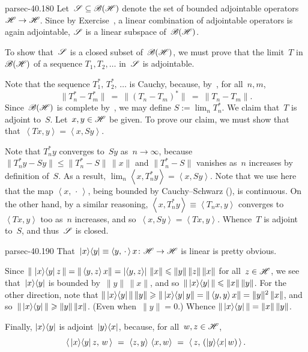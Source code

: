 \documentclass[b5page]{book}
\begin{document}
\begin{solution}{parsec-40.180}%
Let~$\mathscr{S} \subseteq \mathscr{B}(\mathscr{H})$
denote the set of bounded adjointable operators $\mathscr{H}\to\mathscr{H}$.
Since by Exercise~,
a linear combination
of adjointable operators is again adjointable,
$\mathscr{S}$ is a linear subspace of~$\mathscr{B}(\mathscr{H})$.

To show that~$\mathscr{S}$ is a closed subset of~$\mathscr{B}(\mathscr{H})$,
we must prove that 
the limit~$T$ in $\mathscr{B}(\mathscr{H})$
of
a
sequence  $T_1,T_2,\dotsc$
in~$\mathscr{S}$
is adjointable.

Note that the sequence $T_1^*,\,T_2^*,\,\dotsc$
is Cauchy, because,
by~, for all~$n,m$,
    \begin{equation*}
    \|T_n^*-T_m^*\|\ =\ \|(T_n-T_m)^*\|\ =\ \|T_n-T_m\|.
    \end{equation*}
Since~$\mathscr{B}(\mathscr{H})$ is complete
by~,
we may define $S:=\lim_n T_n^*$.
We claim that~$T$ is adjoint to~$S$.
Let~$x,y\in \mathscr{H}$ be given.
To prove our claim,
we must show that
that~$\left<Tx,y\right> = \left<x,Sy\right>$.

Note that $T_n^*y$ converges to~$Sy$ as~$n\to\infty$,
because~$\|T_n^*y-Sy\|\leq \|T_n^*-S\|\,\|x\|$
and $\|T_n^*-S\|$ vanishes as~$n$ increases
    by definition of~$S$.
As a result,
$\lim_n \left<x,T_n^*y\right> = \left<x,Sy\right>$.
Note that we use here
that the map $\left<x,\,\cdot\,\right>$,
being bounded by Cauchy--Schwarz
(),
is continuous.
On the other hand,
by a similar reasoning,
$\left<x,T_n^*y\right>
\equiv \left<T_nx,y\right>$
converges to~$\left<Tx,y\right>$ too
as~$n$ increases,
and so~$\left<x,Sy\right>=\left<Tx,y\right>$.
Whence~$T$ is adjoint to~$S$,
and thus~$\mathscr{S}$ is closed.
\end{solution}
\begin{solution}{parsec-40.190}%
That~$\left|x\right>\!\left<y\right|\equiv \left<y,\,\cdot\,\right>x\colon \mathscr{H}\to\mathscr{H}$ 
is linear is pretty obvious.
    
    Since $\|\,\left|x\right>\!\left<y\right|z\,\|
    = \|\left<y,z\right>x\|
    =\left|\left<y,z\right>\right|\,\|x\|
    \leqslant \|y\|\,\|z\|\,\|x\|$
    for all~$z\in\mathscr{H}$,
    we see that~$\left|x\right>\!\left<y\right|$
    is bounded by~$\|y\|\,\|x\|$,
    and so~$\|\left|x\right>\!\left<y\right|\|\leqslant \|x\|\,\|y\|$.
    For the other direction,
    note that $\|\left|x\right>\!\left<y\right|\| \,\|y\|\geqslant 
    \|\left|x\right>\!\left<y\right|y\|=\|\left<y,y\right>x\|
    = \|y\|^2\,\|x\|$,
    and so~$\|\left|x\right>\!\left<y\right|\|\geqslant \|y\|\,\|x\|$.
    (Even when~$\|y\|=0$.)
    Whence $\|\left|x\right>\!\left<y\right|\|=\|x\|\,\|y\|$.

Finally,  $\left|x\right>\!\left<y\right|$
    is adjoint~$\left|y\right>\!\left<x\right|$,
    because, for all~$w,z\in\mathscr{H}$,
    \begin{equation*}
        \left<\,\ketbra{x}{y}z,\, w\,\right>
        \ = \ 
        \left<z,y\right>\,\left<x,w\right>
        \ = \ 
        \left<\, z,\,(\ketbra{y}{x}w)\,\right>.
    \end{equation*}
\end{solution}
\end{document}
